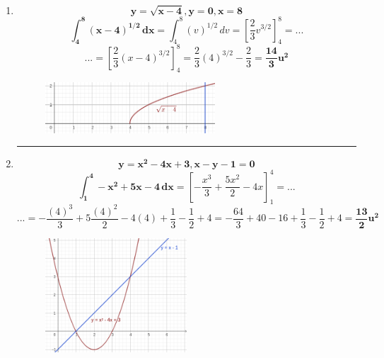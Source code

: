\documentclass[12pt]{article}
\begin{document}
\begin{itemize}
\begin{enumerate}
                \newpage\hrule
                \item \[\bm{y = \sqrt{x - 4}, y = 0, x = 8}\]
                    \[\bm{\int_{4}^{8} (x - 4)^{1/2} \, dx} = \int_{4}^{8} (v)^{1/2} \, dv = \left[\frac{2}{3}v^{3/2}\right]_{4}^{8} = ...\]
                    \[... = \left[\frac{2}{3}(x - 4)^{3/2}\right]_{4}^{8} = \frac{2}{3}(4)^{3/2} - \frac{2}{3} = \bm{\frac{14}{3}u^2}\]
                    \begin{figure}[h!]
                        \centering
                        \includegraphics[width=0.6\textwidth]{img/t6-ej2-3.png}
                    \end{figure}

                \hrule
                \item \[\bm{y = x^2 - 4x + 3, x - y - 1 = 0}\]
                    \[\bm{\int_{1}^{4} - x^2 + 5x - 4 \, dx} = \left[- \frac{x^3}{3} + \frac{5x^2}{2} - 4x\right]_{1}^{4} = ...\]
                    \[... = - \frac{(4)^3}{3} + 5\frac{(4)^2}{2} - 4(4) + \frac{1}{3} - \frac{1}{2} + 4 = - \frac{64}{3} + 40 - 16 + \frac{1}{3} - \frac{1}{2} + 4 = \bm{\frac{13}{2}u^2}\]
                    \begin{figure}[h!]
                        \centering
                        \includegraphics[width=0.5\textwidth]{img/t6-ej2-4.png}
                    \end{figure}
            

\end{enumerate}
\end{itemize}
\end{document}

